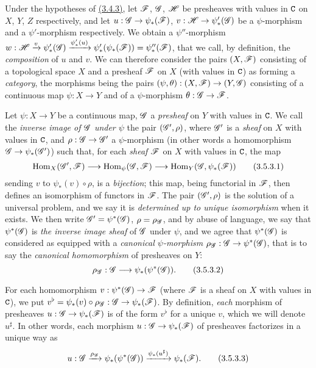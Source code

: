 \begin{env}[3.5.2]
\label{env-0.3.5.2}
Under the hypotheses of \hyperref[env-0.3.4.3]{(3.4.3)}, let $\mathscr{F}$, $\mathscr{G}$, $\mathscr{H}$ be
presheaves with values in $\mathtt{C}$ on $X$, $Y$, $Z$ respectively, and let
$u:\mathscr{G}\to\psi_*(\mathscr{F})$, $v:\mathscr{H}\to\psi_*'(\mathscr{G})$ be a $\psi$-morphism
and a $\psi'$-morphism respectively. We obtain a $\psi''$-morphism
$w:\mathscr{H}\xrightarrow{v}\psi_*'(\mathscr{G})\xrightarrow{\psi_*'(u)}
  \psi_*'(\psi_*(\mathscr{F}))=\psi_*''(\mathscr{F})$, that we call, by definition, the
{\em composition} of $u$ and $v$. We can therefore consider the pairs
$(X,\mathscr{F})$ consisting of a topological space $X$ and a presheaf $\mathscr{F}$ on
$X$ (with values in $\mathtt{C}$) as forming a {\em category}, the morphisms being the
pairs $(\psi,\theta):(X,\mathscr{F})\to(Y,\mathscr{G})$ consisting of a continuous map
$\psi:X\to Y$ and of a $\psi$-morphism $\theta:\mathscr{G}\to\mathscr{F}$.
\end{env}

\begin{env}[3.5.3]
\label{env-0.3.5.3}
Let $\psi:X\to Y$ be a continuous map, $\mathscr{G}$ a {\em presheaf} on $Y$ with
values in $\mathtt{C}$. We call the {\em inverse image of $\mathscr{G}$ under $\psi$} the
pair $(\mathscr{G}',\rho)$, where $\mathscr{G}'$ is a {\em sheaf} on $X$ with values in
$\mathtt{C}$, and $\rho:\mathscr{G}\to\mathscr{G}'$ a $\psi$-morphism (in other words a
homomorphism $\mathscr{G}\to\psi_*(\mathscr{G}')$) such that, for each {\em sheaf}
$\mathscr{F}$ on $X$ with values in $\mathtt{C}$, the map
\[
  {\mathop{\mathrm{Hom}}\nolimits}_X(\mathscr{G}',\mathscr{F})\longrightarrow{\mathop{\mathrm{Hom}}\nolimits}_\psi(\mathscr{G},\mathscr{F})
  \longrightarrow{\mathop{\mathrm{Hom}}\nolimits}_Y(\mathscr{G},\psi_*(\mathscr{F}))
  \tag{3.5.3.1}
\]
sending $v$ to $\psi_*(v)\circ\rho$, is a {\em bijection}; this map, being
functorial in $\mathscr{F}$, then defines an isomorphism of functors in $\mathscr{F}$. The
pair $(\mathscr{G}',\rho)$ is the solution of a universal problem, and we say it is
{\em determined up to unique isomorphism} when it exists. We then write
$\mathscr{G}'=\psi^*(\mathscr{G})$, $\rho=\rho_\mathscr{G}$, and by abuse of language, we say
that $\psi^*(\mathscr{G})$ is {\em the inverse image sheaf} of $\mathscr{G}$ under
$\psi$, and we agree that $\psi^*(\mathscr{G})$ is considered as equipped with a
{\em canonical $\psi$-morphism $\rho_\mathscr{G}:\mathscr{G}\to\psi^*(\mathscr{G})$}, that is
to say the {\em canonical homomorphism} of presheaves on $Y$:
\[
  \rho_\mathscr{G}:\mathscr{G}\longrightarrow\psi_*(\psi^*(\mathscr{G})).
  \tag{3.5.3.2}
\]

For each homomorphism $v:\psi^*(\mathscr{G})\to\mathscr{F}$ (where $\mathscr{F}$ is a sheaf on
$X$ with values in $\mathtt{C}$), we put
$v^\flat=\psi_*(v)\circ\rho_\mathscr{G}:\mathscr{G}\to\psi_*(\mathscr{F})$. By definition,
{\em each} morphism of presheaves $u:\mathscr{G}\to\psi_*(\mathscr{F})$ is of the form
$v^\flat$ for a unique $v$, which we will denote $u^\sharp$. In other words,
each morphism $u:\mathscr{G}\to\psi_*(\mathscr{F})$ of presheaves factorizes in a unique
way as
\[
  u:\mathscr{G}\xrightarrow{\rho_\mathscr{G}}\psi_*(\psi^*(\mathscr{G}))
  \xrightarrow{\psi_*(u^\sharp)}\psi_*(\mathscr{F}).
  \tag{3.5.3.3}
\]
\end{env}


